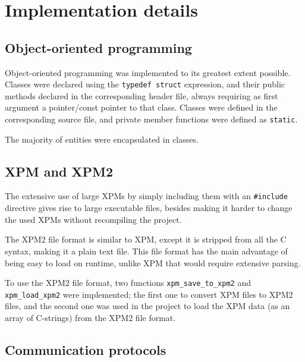 \documentclass{article}
\theoremstyle{remark}
\begin{document}
\section{Implementation details} \label{sec:details}
\subsection{Object-oriented programming}
Object-oriented programming was implemented to its greatest extent possible. Classes were declared using the \texttt{typedef struct} expression, and their public methods declared in the corresponding header file, always requiring as first argument a pointer/const pointer to that class. Classes were defined in the corresponding source file, and private member functions were defined as \texttt{static}.\par
The majority of entities were encapsulated in classes.
\subsection{XPM and XPM2}
The extensive use of large XPMs by simply including them with an \texttt{\#include} directive gives rise to large executable files, besides making it harder to change the used XPMs without recompiling the project.\par
The XPM2 file format is similar to XPM, except it is stripped from all the C syntax, making it a plain text file. This file format has the main advantage of being easy to load on runtime, unlike XPM that would require extensive parsing.\par
To use the XPM2 file format, two functions \texttt{xpm\_save\_to\_xpm2} and \texttt{xpm\_load\_xpm2} were implemented; the first one to convert XPM files to XPM2 files, and the second one was used in the project to load the XPM data (as an array of C-strings) from the XPM2 file format.
\subsection{Communication protocols}
\end{document}
